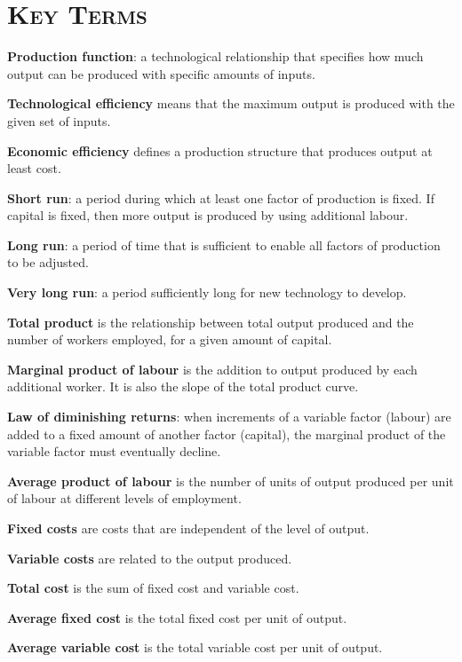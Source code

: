 \newpage
{}
	\section*{\textsc{Key Terms}}
\begin{keyterms}
\textbf{Production function}: a technological relationship that specifies how much output can be produced with specific amounts of inputs.

\textbf{Technological efficiency} means that the maximum output is produced with the given set of inputs.

\textbf{Economic efficiency} defines a production structure that produces output at least cost.

\textbf{Short run}: a period during which at least one factor of production is fixed. If capital is fixed, then more output is produced by using additional labour.

\textbf{Long run}: a period of time that is sufficient to enable all factors of production to be adjusted.

\textbf{Very long run}: a period sufficiently long for new technology to develop.

\textbf{Total product} is the relationship between total output produced and the number of workers employed, for a given amount of capital.

\textbf{Marginal product of labour} is the addition to output produced by each additional worker. It is also the slope of the total product curve.

\textbf{Law of diminishing returns}: when increments of a variable factor (labour) are added to a fixed amount of another factor (capital), the marginal product of the variable factor must eventually decline.

\textbf{Average product of labour} is the number of units of output produced per unit of labour at different levels of employment.

\textbf{Fixed costs} are costs that are independent of the level of output.

\textbf{Variable costs} are related to the output produced.

\textbf{Total cost} is the sum of fixed cost and variable cost.

\textbf{Average fixed cost} is the total fixed cost per unit of output.

\textbf{Average variable cost} is the total variable cost per unit of output.


\end{keyterms}
